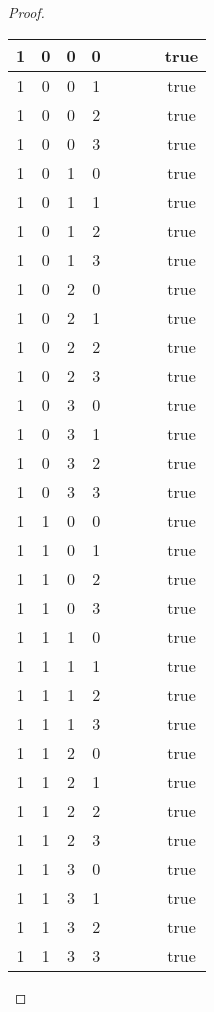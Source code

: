 \documentclass[10pt]{article}
\theoremstyle{definition}
\theoremstyle{plain}
\begin{document}
\begin{proof}
\begin{longtable}{|c|c|c|c|c|c|c|c|}
      1 & 0 & 0 & 0 &  &  &  & true \tabularnewline \hline
      1 & 0 & 0 & 1 &  &  &  & true \tabularnewline \hline
      1 & 0 & 0 & 2 &  &  &  & true \tabularnewline \hline
      1 & 0 & 0 & 3 &  &  &  & true \tabularnewline \hline
      1 & 0 & 1 & 0 &  &  &  & true \tabularnewline \hline
      1 & 0 & 1 & 1 &  &  &  & true \tabularnewline \hline
      1 & 0 & 1 & 2 &  &  &  & true \tabularnewline \hline
      1 & 0 & 1 & 3 &  &  &  & true \tabularnewline \hline
      1 & 0 & 2 & 0 &  &  &  & true \tabularnewline \hline
      1 & 0 & 2 & 1 &  &  &  & true \tabularnewline \hline
      1 & 0 & 2 & 2 &  &  &  & true \tabularnewline \hline
      1 & 0 & 2 & 3 &  &  &  & true \tabularnewline \hline
      1 & 0 & 3 & 0 &  &  &  & true \tabularnewline \hline
      1 & 0 & 3 & 1 &  &  &  & true \tabularnewline \hline
      1 & 0 & 3 & 2 &  &  &  & true \tabularnewline \hline
      1 & 0 & 3 & 3 &  &  &  & true \tabularnewline \hline
      1 & 1 & 0 & 0 &  &  &  & true \tabularnewline \hline
      1 & 1 & 0 & 1 &  &  &  & true \tabularnewline \hline
      1 & 1 & 0 & 2 &  &  &  & true \tabularnewline \hline
      1 & 1 & 0 & 3 &  &  &  & true \tabularnewline \hline
      1 & 1 & 1 & 0 &  &  &  & true \tabularnewline \hline
      1 & 1 & 1 & 1 &  &  &  & true \tabularnewline \hline
      1 & 1 & 1 & 2 &  &  &  & true \tabularnewline \hline
      1 & 1 & 1 & 3 &  &  &  & true \tabularnewline \hline
      1 & 1 & 2 & 0 &  &  &  & true \tabularnewline \hline
      1 & 1 & 2 & 1 &  &  &  & true \tabularnewline \hline
      1 & 1 & 2 & 2 &  &  &  & true \tabularnewline \hline
      1 & 1 & 2 & 3 &  &  &  & true \tabularnewline \hline
      1 & 1 & 3 & 0 &  &  &  & true \tabularnewline \hline
      1 & 1 & 3 & 1 &  &  &  & true \tabularnewline \hline
      1 & 1 & 3 & 2 &  &  &  & true \tabularnewline \hline
      1 & 1 & 3 & 3 &  &  &  & true \tabularnewline \hline


\end{longtable}
\end{proof}
\end{document}
